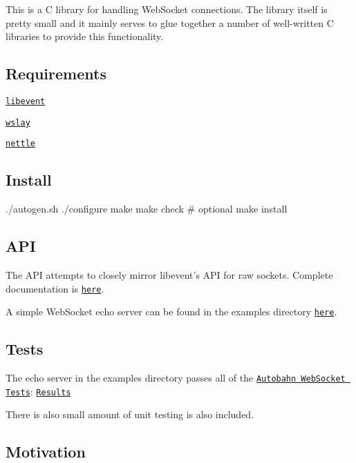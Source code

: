This is a C library for handling Web\-Socket connections. The library itself is pretty small and it mainly serves to glue together a number of well-\/written C libraries to provide this functionality.

\subsection*{Requirements}


\begin{DoxyItemize}
\item \href{http://libevent.org/}{\tt libevent}
\item \href{http://wslay.sourceforge.net/}{\tt wslay}
\item \href{http://www.lysator.liu.se/~nisse/nettle/}{\tt nettle}
\end{DoxyItemize}

\subsection*{Install}

\begin{DoxyVerb}./autogen.sh
./configure
make
make check # optional
make install
\end{DoxyVerb}


\subsection*{A\-P\-I}

The A\-P\-I attempts to closely mirror libevent's A\-P\-I for raw sockets. Complete documentation is \href{http://crunchyfrog.github.io/libevws/doxygen/html/}{\tt here}.

A simple Web\-Socket echo server can be found in the examples directory \href{https://github.com/crunchyfrog/libevws/blob/master/examples/echo_server.c}{\tt here}.

\subsection*{Tests}

The echo server in the examples directory passes all of the \href{http://autobahn.ws/}{\tt Autobahn Web\-Socket Tests}\-: \href{http://crunchyfrog.github.io/libevws/autobahn/}{\tt Results}

There is also small amount of unit testing is also included.

\subsection*{Motivation}

